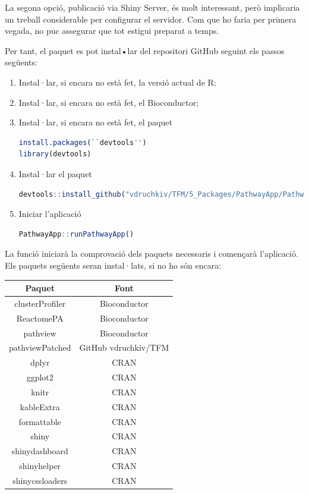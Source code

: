 La segona opció, publicació via Shiny Server, és molt interessant, però implicaria un treball considerable per configurar el servidor. Com que ho faria per primera vegada, no puc assegurar que tot estigui preparat a temps. 

Per tant, el paquet  es pot instal•lar del repositori GitHub seguint els passos següents:

\begin{enumerate}
\item Instal·lar, si encara no està fet, la versió actual de R;

\item Instal·lar, si encara no està fet, el Bioconductor;

\item Instal·lar, si encara no està fet, el paquet 

\begin{lstlisting}[language=R]
install.packages(``devtools'')
library(devtools)
\end{lstlisting}

\item Instal·lar el paquet 

\begin{lstlisting}[language=R]
devtools::install_github("vdruchkiv/TFM/5_Packages/PathwayApp/PathwayApp")
\end{lstlisting}

\item Iniciar l'aplicació 
\begin{lstlisting}[language=R]
PathwayApp::runPathwayApp()
\end{lstlisting}
\end{enumerate}

La funció  iniciarà la comprovació dels paquets necessaris i començarà l'aplicació. Els paquets següents seran instal·lats, si no ho són encara:

\begin{center}
\begin{tabular}{||c | c ||} 
\hline\hline 
\textbf{Paquet} & \textbf{Font} \\ [0.5ex] 
\hline\hline
clusterProfiler & Bioconductor \\
\hline
ReactomePA & Bioconductor \\
\hline
pathview & Bioconductor \\ 
\hline
pathviewPatched & GitHub vdruchkiv/TFM\\
\hline
dplyr & CRAN \\
\hline 
ggplot2 & CRAN \\
\hline
knitr & CRAN \\
\hline
kableExtra & CRAN \\
\hline
formattable & CRAN \\
\hline
shiny & CRAN \\
\hline 
shinydashboard & CRAN \\ 
\hline
shinyhelper & CRAN \\
\hline 
shinycssloaders & CRAN\\
\hline\hline
\end{tabular}
\end{center}


